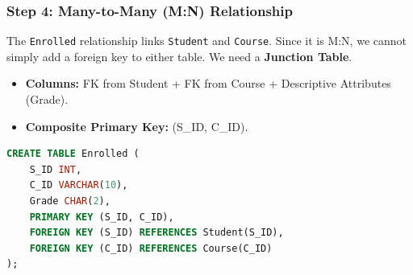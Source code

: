 \documentclass[12pt,a4paper]{article}
\begin{document}
\subsubsection{Step 4: Many-to-Many (M:N) Relationship}
The \texttt{Enrolled} relationship links \texttt{Student} and \texttt{Course}. Since it is M:N, we cannot simply add a foreign key to either table. We need a \textbf{Junction Table}.
\begin{itemize}
    \item \textbf{Columns:} FK from Student + FK from Course + Descriptive Attributes (Grade).
    \item \textbf{Composite Primary Key:} (S\_ID, C\_ID).
\end{itemize}
\begin{lstlisting}[language=SQL]
CREATE TABLE Enrolled (
    S_ID INT,
    C_ID VARCHAR(10),
    Grade CHAR(2),
    PRIMARY KEY (S_ID, C_ID),
    FOREIGN KEY (S_ID) REFERENCES Student(S_ID),
    FOREIGN KEY (C_ID) REFERENCES Course(C_ID)
);
\end{lstlisting}
\end{document}
